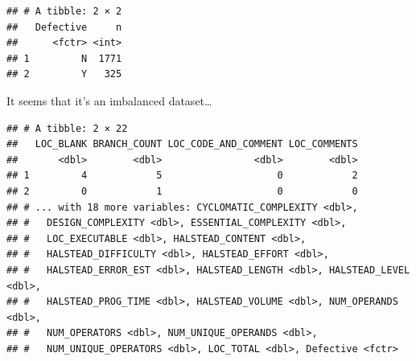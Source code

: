 \documentclass[]{book}
\newenvironment{Shaded}{\begin{snugshade}}{\end{snugshade}}
\newcommand{\KeywordTok}[1]{\textcolor[rgb]{0.13,0.29,0.53}{\textbf{{#1}}}}
\newcommand{\DataTypeTok}[1]{\textcolor[rgb]{0.13,0.29,0.53}{{#1}}}
\newcommand{\DecValTok}[1]{\textcolor[rgb]{0.00,0.00,0.81}{{#1}}}
\newcommand{\FloatTok}[1]{\textcolor[rgb]{0.00,0.00,0.81}{{#1}}}
\newcommand{\StringTok}[1]{\textcolor[rgb]{0.31,0.60,0.02}{{#1}}}
\newcommand{\CommentTok}[1]{\textcolor[rgb]{0.56,0.35,0.01}{\textit{{#1}}}}
\newcommand{\OtherTok}[1]{\textcolor[rgb]{0.56,0.35,0.01}{{#1}}}
\newcommand{\NormalTok}[1]{{#1}}
\begin{document}
\begin{verbatim}
## # A tibble: 2 × 2
##   Defective     n
##      <fctr> <int>
## 1         N  1771
## 2         Y   325
\end{verbatim}

It seems that it's an imbalanced dataset\ldots{}

\begin{Shaded}
\end{Shaded}

\begin{verbatim}
## # A tibble: 2 × 22
##   LOC_BLANK BRANCH_COUNT LOC_CODE_AND_COMMENT LOC_COMMENTS
##       <dbl>        <dbl>                <dbl>        <dbl>
## 1         4            5                    0            2
## 2         0            1                    0            0
## # ... with 18 more variables: CYCLOMATIC_COMPLEXITY <dbl>,
## #   DESIGN_COMPLEXITY <dbl>, ESSENTIAL_COMPLEXITY <dbl>,
## #   LOC_EXECUTABLE <dbl>, HALSTEAD_CONTENT <dbl>,
## #   HALSTEAD_DIFFICULTY <dbl>, HALSTEAD_EFFORT <dbl>,
## #   HALSTEAD_ERROR_EST <dbl>, HALSTEAD_LENGTH <dbl>, HALSTEAD_LEVEL <dbl>,
## #   HALSTEAD_PROG_TIME <dbl>, HALSTEAD_VOLUME <dbl>, NUM_OPERANDS <dbl>,
## #   NUM_OPERATORS <dbl>, NUM_UNIQUE_OPERANDS <dbl>,
## #   NUM_UNIQUE_OPERATORS <dbl>, LOC_TOTAL <dbl>, Defective <fctr>
\end{verbatim}

\begin{Shaded}
\end{Shaded}
\end{document}

